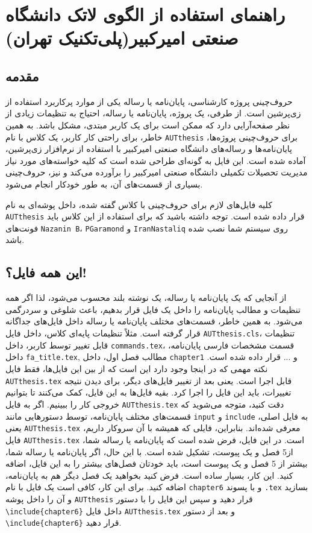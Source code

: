 \chapter{راهنمای استفاده از الگوی لاتک دانشگاه صنعتی امیرکبیر(پلی‌تکنیک تهران)}

\section{مقدمه}
حروف‌چینی پروژه کارشناسی، پایان‌نامه یا رساله یکی از موارد پرکاربرد استفاده از زی‌پرشین است. از طرفی، یک پروژه، پایان‌نامه یا رساله،  احتیاج به تنظیمات زیادی از نظر صفحه‌آرایی  دارد که ممکن است برای
یک کاربر مبتدی، مشکل باشد. به همین خاطر، برای راحتی کار کاربر، یک کلاس با نام 
\verb;AUTthesis;
 برای حروف‌چینی پروژه‌ها، پایان‌نامه‌ها و رساله‌های دانشگاه صنعتی امیرکبیر با استفاده از نرم‌افزار زی‌پرشین،  آماده شده است. این فایل به 
گونه‌ای طراحی شده است که کلیه خواسته‌های مورد نیاز  مدیریت تحصیلات تکمیلی دانشگاه صنعتی امیرکبیر را برآورده می‌کند و نیز، حروف‌چینی بسیاری
از قسمت‌های آن، به طور خودکار انجام می‌شود.

کلیه فایل‌های لازم برای حروف‌چینی با کلاس گفته شده، داخل پوشه‌ای به نام
\verb;AUTthesis;
  قرار داده شده است. توجه داشته باشید که برای استفاده از این کلاس باید فونت‌های
  \verb;Nazanin B;،
 \verb;PGaramond;
 و
  \verb;IranNastaliq;
    روی سیستم شما نصب شده باشد.
\section{این همه فایل؟!}\label{sec2}
از آنجایی که یک پایان‌نامه یا رساله، یک نوشته بلند محسوب می‌شود، لذا اگر همه تنظیمات و مطالب پایان‌نامه را داخل یک فایل قرار بدهیم، باعث شلوغی
و سردرگمی می‌شود. به همین خاطر، قسمت‌های مختلف پایان‌نامه یا رساله  داخل فایل‌های جداگانه قرار گرفته است. مثلاً تنظیمات پایه‌ای کلاس، داخل فایل
\verb;AUTthesis.cls;، 
تنظیمات قابل تغییر توسط کاربر، داخل 
\verb;commands.tex;،
قسمت مشخصات فارسی پایان‌نامه، داخل 
\verb;fa_title.tex;,
مطالب فصل اول، داخل 
\verb;chapter1;
و ... قرار داده شده است. نکته مهمی که در اینجا وجود دارد این است که از بین این  فایل‌ها، فقط فایل 
\verb;AUTthesis.tex;
قابل اجرا است. یعنی بعد از تغییر فایل‌های دیگر، برای دیدن نتیجه تغییرات، باید این فایل را اجرا کرد. بقیه فایل‌ها به این فایل، کمک می‌کنند تا بتوانیم خروجی کار را ببینیم. اگر به فایل 
\verb;AUTthesis.tex;
دقت کنید، متوجه می‌شوید که قسمت‌های مختلف پایان‌نامه، توسط دستورهایی مانند 
\verb;input;
و
\verb;include;
به فایل اصلی، یعنی 
\verb;AUTthesis.tex;
معرفی شده‌اند. بنابراین، فایلی که همیشه با آن سروکار داریم، فایل 
\verb;AUTthesis.tex;
است.
در این فایل، فرض شده است که پایان‌نامه یا رساله شما، از5 فصل و یک پیوست، تشکیل شده است. با این حال، اگر
  پایان‌نامه یا رساله شما، بیشتر از 5 فصل و یک پیوست است، باید خودتان فصل‌های بیشتر را به این فایل، اضافه کنید. این کار، بسیار ساده است. فرض کنید بخواهید یک فصل دیگر هم به پایان‌نامه، اضافه کنید. برای این کار، کافی است یک فایل با نام 
\verb;chapter6;
و با پسوند 
\verb;.tex;
بسازید و آن را داخل پوشه 
\verb;AUTthesis;
قرار دهید و سپس این فایل را با دستور 
\texttt{\textbackslash include\{chapter6\}}
داخل فایل
\verb;AUTthesis.tex;
و بعد از دستور
\texttt{\textbackslash include\{chapter6\}}
 قرار دهید.

